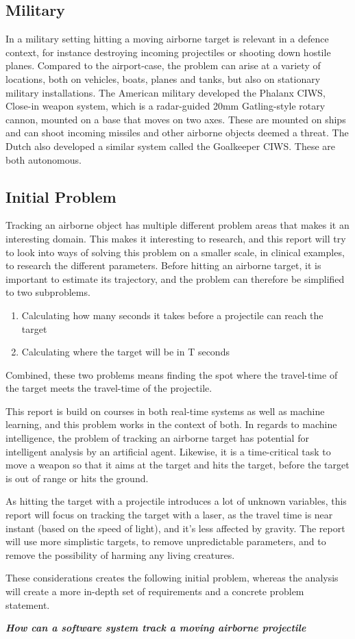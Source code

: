 \subsection{Military}
In a military setting hitting a moving airborne target is relevant in a defence context, for instance destroying incoming projectiles or shooting down hostile planes. 
Compared to the airport-case, the problem can arise at a variety of locations, both on vehicles, boats, planes and tanks, but also on stationary military installations.
The American military developed the Phalanx CIWS, Close-in weapon system, which is a radar-guided 20mm Gatling-style rotary cannon, mounted on a base that moves on two axes\cite{PhalanxCIWS}.
These are mounted on ships and can shoot incoming missiles and other airborne objects deemed a threat. 
The Dutch also developed a similar system called the Goalkeeper CIWS.
These are both autonomous.

\subsection{Initial Problem}

Tracking an airborne object has multiple different problem areas that makes it an interesting domain.
This makes it interesting to research, and this report will try to look into ways of solving this problem on a smaller scale, in clinical examples, to research the different parameters. 
Before hitting an airborne target, it is important to estimate its trajectory, and the problem can therefore be simplified to two subproblems.
\begin{enumerate}
	\item Calculating how many seconds it takes before a projectile can reach the target
	\item Calculating where the target will be in T seconds
\end{enumerate}
Combined, these two problems means finding the spot where the travel-time of the target meets the travel-time of the projectile.

This report is build on courses in both real-time systems as well as machine learning, and this problem works in the context of both. 
In regards to machine intelligence, the problem of tracking an airborne target has potential for intelligent analysis by an artificial agent. 
Likewise, it is a time-critical task to move a weapon so that it aims at the target and hits the target, before the target is out of range or hits the ground.

As hitting the target with a projectile introduces a lot of unknown variables, this report will focus on tracking the target with a laser, as the travel time is near instant (based on the speed of light), and it's less affected by gravity. 
The report will use more simplistic targets, to remove unpredictable parameters, and to remove the possibility of harming any living creatures.


These considerations creates the following initial problem, whereas the analysis will create a more in-depth set of requirements and a concrete problem statement. 
\begin{center}
	\textit{\textbf{How can a software system track a moving airborne projectile}}
\end{center}
